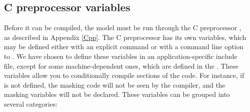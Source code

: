 \subsection{C preprocessor variables}
\label{Cpp1}
Before it can be compiled, the model must be run through the C
preprocessor , as described in Appendix \ref{Cpp}. The C
preprocessor has its own variables, which may be defined either with an
explicit  command or with a command line option to
. We have chosen to define these variables in an
application-specific include file, except for some
machine-dependent ones, which are defined in the .
These variables allow you to conditionally compile sections of the
code. For instance, if  is not defined, the masking
code will not be seen by the compiler, and the masking variables will
not be declared. These  variables can be grouped into
several categories:
